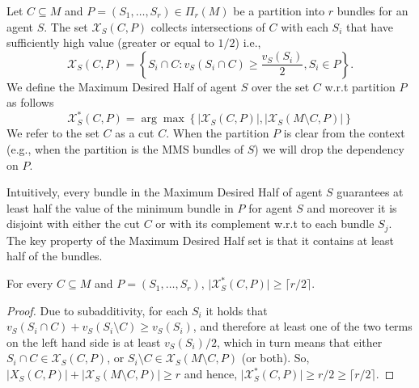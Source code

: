 \begin{definition}  Let $C \subseteq M$ and $P=\left(S_1,\ldots,S_r\right)\in \Pi_r(M)$ be a partition into $r$ bundles for an agent $S$. The set $\mathcal{X}_S(C,P)$ collects intersections of $C$ with each $S_i$ that have sufficiently high value (greater or equal to $1/2$) i.e.,
$$\mathcal{X}_S(C,P)=\left\{S_i \cap C : v_S\left(S_i\cap C\right)\ge \frac{v_S\left(S_i\right)}{2}, S_i \in P\right\}.$$
We define the Maximum Desired Half of agent $S$ over the set $C$ w.r.t partition $P$ as follows
$$\mathcal{X}_{S}^*(C,P) = \arg \max\left\{\lvert \mathcal{X}_S(C,P)\rvert,\lvert \mathcal{X}_S(M\setminus C,P) \rvert\right\}$$
We refer to the set $C$ as a cut $C$. When the partition $P$ is clear from the context (e.g., when the partition is the MMS bundles of $S$) we will drop the dependency on $P$.
\end{definition}

Intuitively, every bundle in the Maximum Desired Half of agent $S$
guarantees at least half the value of the minimum bundle in $P$ for
agent $S$ and moreover it is disjoint with either the cut $C$ or with
its complement w.r.t to each bundle $S_j$. The key property of the
Maximum Desired Half set is that it contains at least half of the
bundles.

\begin{observation}
\label{obs:Cut_noOfDesiredSets}
For every $C \subseteq M$ and $P=(S_1,\ldots,S_r)$, $\lvert \mathcal{X}^*_{S}(C,P)\rvert \ge \lceil r/2\rceil$.
\end{observation}
\begin{proof}
 Due to subadditivity, for each $S_i$ it holds that $v_S(S_i \cap C)+v_S(S_i \setminus C) \ge v_S(S_i)$, and therefore at least one of the two terms on the left hand side is at least $v_S(S_i)/2$, which in turn means that either $S_i\cap C \in \mathcal{X}_S(C,P)$, or $S_i \setminus C \in \mathcal{X}_S({M \setminus C},P)$ (or both). So, $\lvert {X}_S(C,P) \rvert +\lvert \mathcal{X}_S({M \setminus C},P) \rvert \ge r$ and hence, $\lvert \mathcal{X}^*_{S}(C,P)\rvert \ge r/2 \ge \lceil r/2\rceil$.   
\end{proof}



